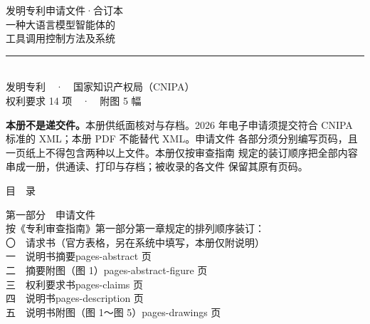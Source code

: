 \documentclass[12pt,UTF8]{ctexart}
\newcommand{\docpages}[1]{\csname pages-#1\endcsname}
\begin{document}
\null\vspace*{0.16\textheight}
\begin{center}
  {\color{black!55} 发明专利申请文件·合订本}\\[14mm]
  {\cbf 一种大语言模型智能体的}\\[4mm]
  {\cbf 工具调用控制方法及系统}\\[16mm]
  \rule{0.5\linewidth}{0.6pt}\\[8mm]
  { 发明专利　·　国家知识产权局（CNIPA）}\\[3mm]
  { 权利要求 14 项　·　附图 5 幅}\\[16mm]
  \begin{minipage}{0.8\linewidth}
    \textbf{本册不是递交件。}本册供纸面核对与存档。2026 年电子申请须提交符合 CNIPA 标准的 XML；本册 PDF 不能替代 XML。申请文件
    各部分须分别编写页码，且一页纸上不得包含两种以上文件。本册仅按审查指南
    规定的装订顺序把全部内容串成一册，供通读、打印与存档；被收录的各文件
    保留其原有页码。
  \end{minipage}
\end{center}
\clearpage

\null\vspace*{0.08\textheight}
\begin{center}{\cbf 目　录}\end{center}
\vspace{10mm}

{\cbf 第一部分　申请文件}\\[2mm]
\hspace*{2em}按《专利审查指南》第一部分第一章规定的排列顺序装订：\\[3mm]
\hspace*{2em}〇　请求书\hfill（官方表格，另在系统中填写，本册仅附说明）\\[2mm]
\hspace*{2em}一　说明书摘要\hfill \docpages{abstract} 页\\[2mm]
\hspace*{2em}二　摘要附图（图 1）\hfill \docpages{abstract-figure} 页\\[2mm]
\hspace*{2em}三　权利要求书\hfill \docpages{claims} 页\\[2mm]
\hspace*{2em}四　说明书\hfill \docpages{description} 页\\[2mm]
\hspace*{2em}五　说明书附图（图 1～图 5）\hfill \docpages{drawings} 页\\[8mm]
\end{document}
